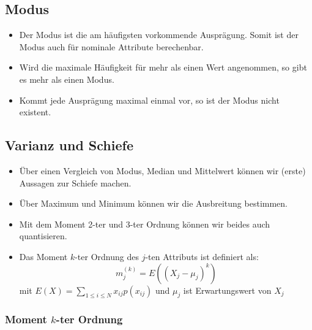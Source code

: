 \documentclass{scrartcl}
\begin{document}
\subsection{Modus}

\begin{itemize}
	\item Der Modus ist die am häufigsten vorkommende Ausprägung. Somit ist der 
	Modus auch für nominale Attribute berechenbar.
	\item Wird die maximale Häufigkeit für mehr als einen Wert angenommen, so 
	gibt es mehr als einen Modus.
	\item Kommt jede Ausprägung maximal einmal vor, so ist der Modus nicht 
	existent.
\end{itemize}

\subsection{Varianz und Schiefe}

\begin{itemize}
	\item Über einen Vergleich von Modus, Median und Mittelwert können wir 
	(erste) Aussagen zur Schiefe machen.
	\item Über Maximum und Minimum können wir die Ausbreitung bestimmen.
	\item Mit dem Moment 2-ter und 3-ter Ordnung können wir beides auch 
	quantisieren.
	\item Das Moment $ k $-ter Ordnung des $ j $-ten Attributs ist definiert 
	als:
	\[ m_j^{(k)} = E((X_j - \mu_j)^k) \]
	mit $ E(X) = \sum_{1 \leq i \leq N} x_{ij} p(x_{ij}) $ und $ \mu_j $ ist 
	Erwartungswert von $ X_j $
\end{itemize}

\subsubsection{Moment $ k $-ter Ordnung}
\end{document}
